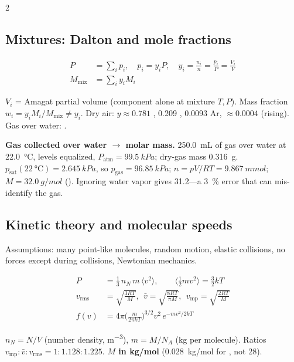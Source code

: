 \begin{multicols}{2}
\subsection{Mixtures: Dalton and mole fractions}\label{sec:dalton}
\begin{formulabox}
\vspace{-6pt}
\begin{align}
P &= \textstyle\sum_i p_i,\quad p_i=y_iP,\quad y_i=\frac{n_i}{n}=\frac{p_i}{P}=\frac{V_i}{V} \label{F:gas:dalton}\\
M_{\text{mix}} &= \textstyle\sum_i y_iM_i \label{F:gas:Mmix}
\end{align}
\end{formulabox}
$V_i$ = Amagat partial volume (component alone at mixture $T,P$). Mass fraction $w_i=y_iM_i/M_{\text{mix}}\ne y_i$. Dry air: $y\approx0.781$ , 0.209 , 0.0093 Ar, $\approx0.0004$  (rising). Gas over water: .

\begin{demobox}\textbf{Gas collected over water $\to$ molar mass.} \SI{250.0}{mL} of gas over water at \SI{22.0}{\celsius}, levels equalized, $P_{\text{atm}}=\SI{99.5}{kPa}$; dry-gas mass \SI{0.316}{g}. $p_{\text{sat}}(\SI{22}{\celsius})=\SI{2.645}{kPa}$, so $p_{\text{gas}}=\SI{96.85}{kPa}$; $n=pV/RT=\SI{9.867}{mmol}$; $M=\SI{32.0}{g/mol}$ (). Ignoring water vapor gives 31.2---a \SI{3}{\percent} error that can mis-identify the gas.\end{demobox}

\subsection{Kinetic theory and molecular speeds}\label{sec:kinetic}
\CORE{} Assumptions: many point-like molecules, random motion, elastic collisions, no forces except during collisions, Newtonian mechanics.
\begin{formulabox}
\vspace{-6pt}
\begin{align}
P &= \tfrac13\,n_N\,m\,\langle v^2\rangle,\qquad \langle \tfrac12 mv^2\rangle=\tfrac32kT \label{F:gas:kinetic}\\
v_{\text{rms}} &= \sqrt{\frac{3RT}{M}},\ \ \bar v=\sqrt{\frac{8RT}{\pi M}},\ \ v_{\text{mp}}=\sqrt{\frac{2RT}{M}} \label{F:gas:speeds}\\
f(v) &= 4\pi\Big(\frac{m}{2\pi kT}\Big)^{3/2}v^2\,e^{-mv^2/2kT} \label{F:gas:maxwell}
\end{align}
\end{formulabox}
$n_N=N/V$ (number density, \si{m^{-3}}), $m=M/N_A$ (kg per molecule). Ratios $v_{\text{mp}}:\bar v:v_{\text{rms}}=1:1.128:1.225$. \textbf{$M$ in kg/mol} (\SI{0.028}{kg/mol} for , not 28).


\end{multicols}
